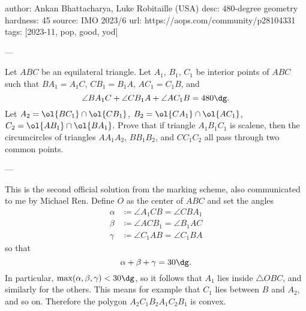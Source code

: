 author: Ankan Bhattacharya, Luke Robitaille (USA)
desc: $480$-degree geometry
hardness: 45
source: IMO 2023/6
url: https://aops.com/community/p28104331
tags: [2023-11, pop, good, yod]

---

Let $ABC$ be an equilateral triangle.
Let $A_1$, $B_1$, $C_1$ be interior points of $ABC$
such that $BA_1=A_1C$, $CB_1=B_1A$, $AC_1=C_1B$, and
\[ \angle BA_1C + \angle CB_1A + \angle AC_1B = 480\dg. \]
Let $A_2 = \ol{BC_1} \cap \ol{CB_1}$, $B_2 = \ol{CA_1} \cap \ol{AC_1}$,
$C_2 = \ol{AB_1} \cap \ol{BA_1}$.
Prove that if triangle $A_1B_1C_1$ is scalene,
then the circumcircles of triangles $AA_1A_2$, $BB_1B_2$, and $CC_1C_2$
all pass through two common points.

---

This is the second official solution from the marking scheme,
also communicated to me by Michael Ren.
Define $O$ as the center of $ABC$ and set the angles
\begin{align*}
  \alpha &\coloneqq \angle A_1CB = \angle CBA_1 \\
  \beta &\coloneqq \angle ACB_1 = \angle B_1AC \\
  \gamma &\coloneqq \angle C_1AB = \angle C_1BA
\end{align*}
so that
\[ \alpha + \beta + \gamma = 30\dg. \]
In particular, $\max(\alpha,\beta,\gamma) < 30\dg$,
so it follows that $A_1$ lies inside $\triangle OBC$, and similarly for the others.
This means for example that $C_1$ lies between $B$ and $A_2$, and so on.
Therefore the polygon $A_2C_1B_2A_1C_2B_1$ is convex.

